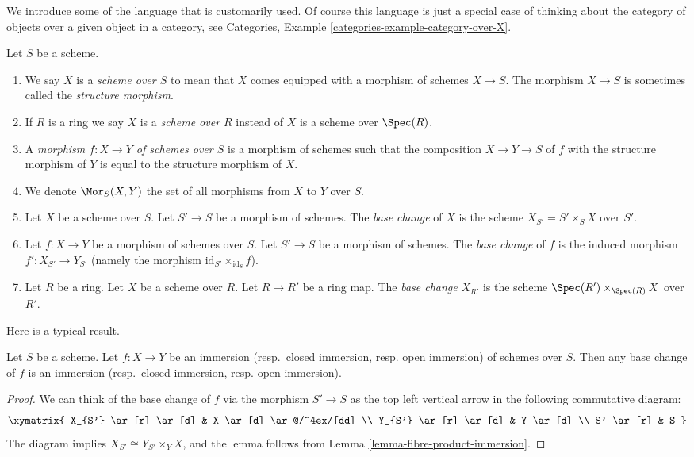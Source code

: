\medskip\noindent
We introduce some of the language that is customarily used.
Of course this language is just a special case of thinking
about the category of objects over a given object in a category,
see Categories, Example \ref{categories-example-category-over-X}.

\begin{definition}
\label{definition-base-change}
Let $S$ be a scheme.
\begin{enumerate}
\item We say $X$ is a {\it scheme over $S$} to mean that $X$
comes equipped with a morphism of schemes $X \to S$.
The morphism $X \to S$ is sometimes called the
{\it structure morphism}.
\item If $R$ is a ring we say
$X$ is a {\it scheme over $R$} instead of
$X$ is a scheme over $\Spec(R)$.
\item A {\it morphism $f : X \to Y$ of schemes over $S$}
is a morphism of schemes such that the composition
$X \to Y \to S$ of $f$ with the structure morphism of $Y$ is
equal to the structure morphism of $X$.
\item We denote $\Mor_S(X, Y)$ the set of all morphisms
from $X$ to $Y$ over $S$.
\item Let $X$ be a scheme over $S$. Let $S' \to S$ be a
morphism of schemes. The {\it base change} of $X$
is the scheme $X_{S'} = S' \times_S X$ over $S'$.
\item Let $f : X \to Y$ be a morphism of schemes over $S$. Let $S' \to S$
be a morphism of schemes. The {\it base change} of $f$ is
the induced morphism $f' : X_{S'} \to Y_{S'}$ (namely the
morphism $\text{id}_{S'} \times_{\text{id}_S} f$).
\item Let $R$ be a ring. Let $X$ be a scheme over $R$.
Let $R \to R'$ be a ring map. The {\it base change} $X_{R'}$
is the scheme $\Spec(R') \times_{\Spec(R)} X$
over $R'$.
\end{enumerate}
\end{definition}

\noindent
Here is a typical result.

\begin{lemma}
\label{lemma-base-change-immersion}
Let $S$ be a scheme. Let $f : X \to Y$ be an
immersion (resp.\ closed immersion, resp. open immersion)
of schemes over $S$. Then any base change of $f$ is an
immersion (resp.\ closed immersion, resp. open immersion).
\end{lemma}

\begin{proof}
We can think of the base change of $f$ via the morphism
$S' \to S$ as the top left vertical arrow in the following
commutative diagram:
$$
\xymatrix{
X_{S'} \ar[r] \ar[d] & X \ar[d] \ar@/^4ex/[dd] \\
Y_{S'} \ar[r] \ar[d] & Y \ar[d] \\
S' \ar[r] & S
}
$$
The diagram implies $X_{S'} \cong Y_{S'} \times_Y X$,
and the lemma follows from Lemma \ref{lemma-fibre-product-immersion}.
\end{proof}

